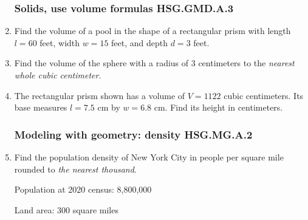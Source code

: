 \begin{enumerate}
\newpage
\subsubsection*{Solids, use volume formulas \hfill HSG.GMD.A.3}
\item Find the volume of a pool in the shape of a rectangular prism with length $l=60$ feet, width $w=15$ feet, and depth $d=3$ feet.
  \begin{flushright}
  \end{flushright} \vspace{1cm}

\item Find the volume of the sphere with a radius of 3 centimeters to the \emph{nearest whole cubic centimeter}. \vspace{3cm}

\item The rectangular prism shown has a volume of $V=1122$ cubic centimeters. Its base measures $l=7.5$ cm by $w=6.8$ cm. Find its height in centimeters.
\begin{flushright}
\end{flushright} \vspace{1cm}

\subsubsection*{Modeling with geometry: density \hfill HSG.MG.A.2}
\item Find the population density of New York City in people per square mile rounded to \emph{the nearest thousand}. \par \smallskip
  Population at 2020 census: 8,800,000 \par
  Land area: 300 square miles



\end{enumerate}
